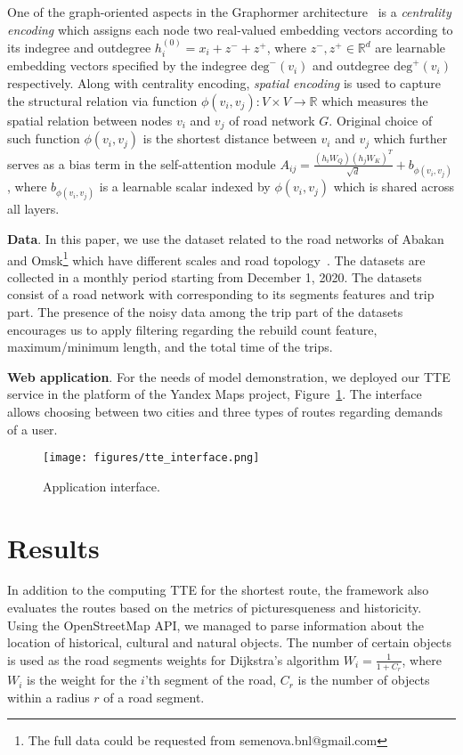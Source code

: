\documentclass{svproc}
\begin{document}
One of the graph-oriented aspects in the Graphormer architecture~\cite{graphormer} is a \emph{centrality encoding} which assigns each node two real-valued embedding vectors according to its indegree and outdegree $h_{i}^{(0)}=x_{i}+z^{-}+z^{+}$, where $z^{-}, z^{+} \in \mathbb{R}^d$ are learnable embedding vectors specified by the indegree $\text{deg}^{-}(v_i)$ and outdegree $\text{deg}^{+}(v_i)$ respectively. Along with centrality encoding, \emph{spatial encoding} is used to capture the structural relation via function $\phi(v_i, v_j):V\times V\to\mathbb{R}$ which measures the spatial relation between nodes $v_i$ and $v_j$ of road network $G$. Original choice of such function $\phi(v_i,v_j)$ is the shortest distance between $v_i$ and $v_j$ which further serves as a bias term in the self-attention module $A_{ij}=\frac{(h_iW_{Q})(h_jW_{K})^T}{\sqrt{d}}  + b_{\phi(v_i,v_j)}$, where $b_{\phi(v_i,v_j)}$ is a learnable scalar indexed by $\phi(v_i,v_j)$ which is shared across all layers.

\textbf{Data}. In this paper, we use the dataset related to the road networks of Abakan and Omsk\footnote{The full data could be requested from semenova.bnl@gmail.com} which have different scales and road topology~\cite{Hybrid}. The datasets are collected in a monthly period starting from December 1, 2020. The datasets consist of a road network with corresponding to its segments features and trip part. The presence of the noisy data among the trip part of the datasets encourages us to apply filtering regarding the rebuild count feature, maximum/minimum length, and the total time of the trips. 

\textbf{Web application}. For the needs of model demonstration, we deployed our TTE service in the platform of the Yandex Maps project, Figure~\ref{interface}. The interface allows choosing between two cities and three types of routes regarding demands of a user.  


\begin{figure}[t]
\texttt{[image: figures/tte\_interface.png]}
\caption{Application interface.} 
\label{interface}
\end{figure}

\section{Results}
In addition to the computing TTE for the shortest route, the framework also evaluates the routes based on the metrics of picturesqueness and historicity. Using the OpenStreetMap API, we managed to parse information about the location of historical, cultural and natural objects. The number of certain objects is used as the road segments weights for Dijkstra's algorithm $W_i = \frac{1}{1 + C_r}$, where $W_i$ is the weight for the $i$'th segment of the road, $C_r$ is the number of objects within a radius $r$ of a road segment.
\end{document}

